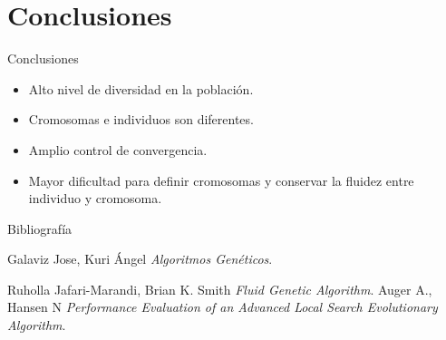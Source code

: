 \documentclass[10pt]{beamer}
\begin{document}
\section{Conclusiones}

\begin{frame}{Conclusiones}

	\begin{itemize}[<+- | alert@+>]
	
		\item Alto nivel de diversidad en la población.
		
		\item Cromosomas e individuos son diferentes.
		
		\item Amplio control de convergencia.
		
		\item Mayor dificultad para definir cromosomas y conservar la fluidez
		entre individuo y cromosoma.
	
	\end{itemize}

\end{frame}


\begin{frame}{Bibliografía}


\begin{thebibliography}{9}


		Galaviz Jose, Kuri Ángel \emph{Algoritmos Genéticos}.
		
		Ruholla Jafari-Marandi, Brian K. Smith \emph{Fluid Genetic Algorithm}.
		Auger A., Hansen N \emph{Performance Evaluation of an Advanced Local Search Evolutionary Algorithm}.
		


\end{thebibliography}
%

	
%  
%  

\end{frame}
\end{document}
